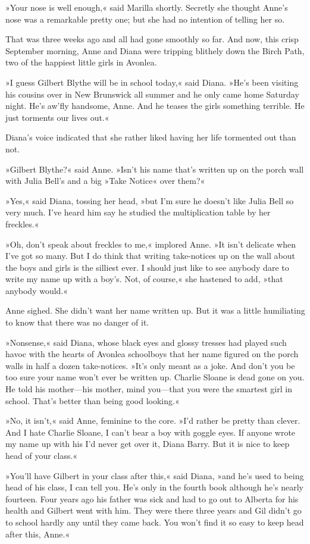 »Your nose is well enough,« said Marilla shortly. Secretly she thought Anne’s nose was a remarkable pretty one; but she had no intention of telling her so.

That was three weeks ago and all had gone smoothly so far. And now, this crisp September morning, Anne and Diana were tripping blithely down the Birch Path, two of the happiest little girls in Avonlea.

»I guess Gilbert Blythe will be in school today,« said Diana. »He’s been visiting his cousins over in New Brunswick all summer and he only came home Saturday night. He’s aw’fly handsome, Anne. And he teases the girls something terrible. He just torments our lives out.«

Diana’s voice indicated that she rather liked having her life tormented out than not.

»Gilbert Blythe?« said Anne. »Isn’t his name that’s written up on the porch wall with Julia Bell’s and a big »Take Notice« over them?«

»Yes,« said Diana, tossing her head, »but I’m sure he doesn’t like Julia Bell so very much. I’ve heard him say he studied the multiplication table by her freckles.«

»Oh, don’t speak about freckles to me,« implored Anne. »It isn’t delicate when I’ve got so many. But I do think that writing take-notices up on the wall about the boys and girls is the silliest ever. I should just like to see anybody dare to write my name up with a boy’s. Not, of course,« she hastened to add, »that anybody would.«

Anne sighed. She didn’t want her name written up. But it was a little humiliating to know that there was no danger of it.

»Nonsense,« said Diana, whose black eyes and glossy tresses had played such havoc with the hearts of Avonlea schoolboys that her name figured on the porch walls in half a dozen take-notices. »It’s only meant as a joke. And don’t you be too sure your name won’t ever be written up. Charlie Sloane is dead gone on you. He told his mother—his mother, mind you—that you were the smartest girl in school. That’s better than being good looking.«

»No, it isn’t,« said Anne, feminine to the core. »I’d rather be pretty than clever. And I hate Charlie Sloane, I can’t bear a boy with goggle eyes. If anyone wrote my name up with his I’d never get over it, Diana Barry. But it is nice to keep head of your class.«

»You’ll have Gilbert in your class after this,« said Diana, »and he’s used to being head of his class, I can tell you. He’s only in the fourth book although he’s nearly fourteen. Four years ago his father was sick and had to go out to Alberta for his health and Gilbert went with him. They were there three years and Gil didn’t go to school hardly any until they came back. You won’t find it so easy to keep head after this, Anne.«

